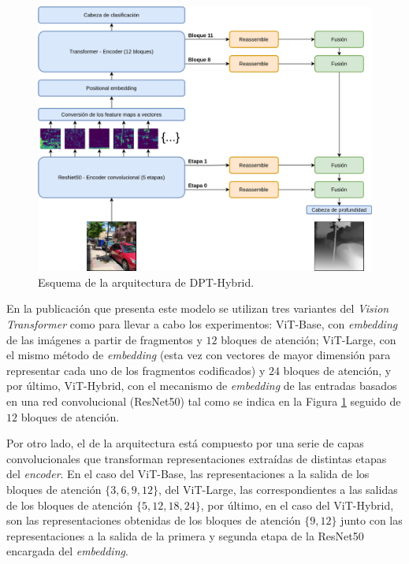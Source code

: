 \begin{figure}[H]
\centering
\includegraphics[width=\linewidth]{imagenes/DPT-general.png} 
\captionsetup{width=.7\linewidth}
\caption{Esquema de la arquitectura de DPT-Hybrid.}
\label{fig:dpt-hybrid}
\end{figure}

En la publicación que presenta este modelo se utilizan tres variantes del \textit{Vision Transformer} como  para llevar a cabo los experimentos: ViT-Base, con \textit{embedding} de las imágenes a partir de fragmentos y $12$ bloques de atención; ViT-Large, con el mismo método de \textit{embedding} (esta vez con vectores de mayor dimensión para representar cada uno de los fragmentos codificados) y $24$ bloques de atención, y por último, ViT-Hybrid, con el mecanismo de \textit{embedding} de las entradas basados en una red convolucional (ResNet50) tal como se indica en la Figura \ref{fig:dpt-hybrid} seguido de $12$ bloques de atención.

Por otro lado, el  de la arquitectura está compuesto por una serie de capas convolucionales que transforman representaciones extraídas de distintas etapas del \textit{encoder}. En el caso del ViT-Base, las representaciones a la salida de los bloques de atención $\{3, 6, 9, 12\}$, del ViT-Large, las correspondientes a las salidas de los bloques de atención $\{5, 12, 18, 24\}$, por último, en el caso del ViT-Hybrid, son las representaciones obtenidas de los bloques de atención $\{9, 12\}$ junto con las representaciones a la salida de la primera y segunda etapa de la ResNet50 encargada del \textit{embedding}.

